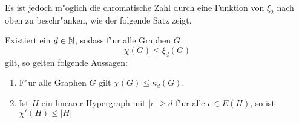 Es ist jedoch m"oglich die chromatische Zahl durch eine Funktion von $\xi_2$ nach oben zu beschr"anken, wie der folgende Satz zeigt.
%
%  
%
%

\begin{theorem}
  \label{thm:MainTheorem}
  Existiert ein $d\in {\mathbb{N}}$, sodass f"ur alle  Graphen $G$ $$\chi(G) \leq \xi_{d}(G)$$ gilt, so gelten folgende Aussagen:
  \begin{enumerate}[label=\rm{(\alph*)}]
    \item F"ur alle Graphen $G$ gilt $\chi(G) \leq \kappa_d (G)$.
    \item  Ist $H$ ein linearer Hypergraph mit $\left|e\right| \geq d$ f"ur alle $e\in E(H)$, so ist $\chi'\left( H \right)\leq \left|H\right| $
  \end{enumerate}
\end{theorem}

